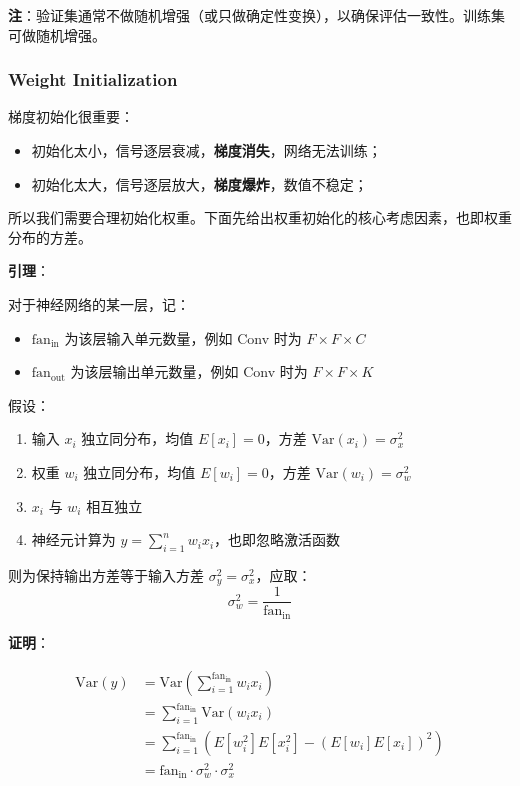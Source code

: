 \textbf{注}：验证集通常不做随机增强（或只做确定性变换），以确保评估一致性。训练集可做随机增强。

\subsubsection{Weight Initialization}\label{weight-initialization}

梯度初始化很重要：

\begin{itemize}
\tightlist
\item
  初始化太小，信号逐层衰减，\textbf{梯度消失}，网络无法训练；
\item
  初始化太大，信号逐层放大，\textbf{梯度爆炸}，数值不稳定；
\end{itemize}

所以我们需要合理初始化权重。下面先给出权重初始化的核心考虑因素，也即权重分布的方差。

\textbf{引理}：

对于神经网络的某一层，记：

\begin{itemize}
\tightlist
\item
  $\text{fan}_{\text{in}}$ 为该层输入单元数量，例如 Conv 时为
  $F \times F \times C$
\item
  $\text{fan}_{\text{out}}$ 为该层输出单元数量，例如 Conv 时为
  $F \times F \times K$
\end{itemize}

假设：

\begin{enumerate}
\def\labelenumi{\arabic{enumi}.}
\tightlist
\item
  输入 $x_i$ 独立同分布，均值 $E[x_i] = 0$，方差
  $\text{Var}(x_i) = \sigma_x^2$
\item
  权重 $w_i$ 独立同分布，均值 $E[w_i] = 0$，方差
  $\text{Var}(w_i) = \sigma_w^2$
\item
  $x_i$ 与 $w_i$ 相互独立
\item
  神经元计算为 $y = \sum_{i=1}^{n} w_i x_i$，也即忽略激活函数
\end{enumerate}

则为保持输出方差等于输入方差 $\sigma_y^2 = \sigma_x^2$，应取：
\[
\sigma_w^2 = \frac{1}{\text{fan}_{\text{in}}}
\]

\textbf{证明}：

\[
\begin{aligned}
\text{Var}(y)
&= \text{Var}\left(\sum_{i=1}^{\text{fan}_{\text{in}}} w_i x_i\right) \\
&= \sum_{i=1}^{\text{fan}_{\text{in}}} \text{Var}(w_i x_i) \\
&= \sum_{i=1}^{\text{fan}_{\text{in}}} \left( E[w_i^2] E[x_i^2] - (E[w_i]E[x_i])^2 \right) \\
&= \text{fan}_{\text{in}} \cdot \sigma_w^2 \cdot \sigma_x^2
\end{aligned}
\]

